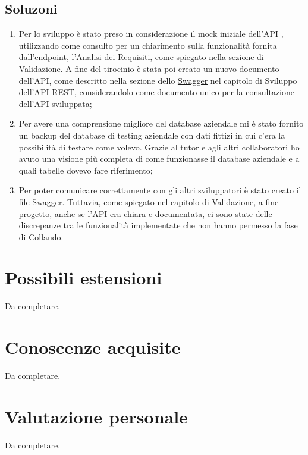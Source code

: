 \subsection{Soluzoni}
\begin{enumerate}
\item Per lo sviluppo è stato preso in considerazione il mock iniziale dell’API , utilizzando come consulto per un chiarimento sulla funzionalità fornita dall’endpoint, l’Analisi dei Requisiti, come spiegato nella sezione di \hyperlink{validation}{Validazione}. A fine del tirocinio è stata poi creato un nuovo documento dell'API, come descritto nella sezione dello \hyperlink{swagger}{Swagger} nel capitolo di Sviluppo dell’API REST, considerandolo come documento unico per la consultazione dell’API sviluppata;
\item Per avere una comprensione migliore del database aziendale mi è stato fornito un backup del database di testing aziendale con dati fittizi in cui c’era la possibilità di testare come volevo. Grazie al tutor e agli altri collaboratori ho avuto una visione più completa di come funzionasse il database aziendale e a quali tabelle dovevo fare riferimento;
\item Per poter comunicare correttamente con gli altri sviluppatori è stato creato il file Swagger. Tuttavia, come spiegato nel capitolo di \hyperlink{validation}{Validazione}, a fine progetto, anche se l’API era chiara e documentata, ci sono state delle discrepanze tra le funzionalità implementate che non hanno permesso la fase di Collaudo.
\end{enumerate}


\section{Possibili estensioni}
Da completare.

\section{Conoscenze acquisite}
Da completare.

\section{Valutazione personale}
Da completare.
